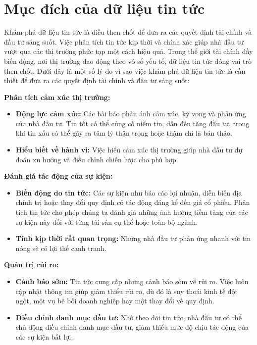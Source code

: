 \section{Mục đích của dữ liệu tin tức}

Khám phá dữ liệu tin tức là điều then chốt để đưa ra các quyết định tài chính và đầu tư sáng suốt. Việc phân tích tin tức kịp thời và chính xác giúp nhà đầu tư vượt qua các thị trường phức tạp một cách hiệu quả. Trong thế giới tài chính đầy biến động, nơi thị trường dao động theo vô số yếu tố, dữ liệu tin tức đóng vai trò then chốt. Dưới đây là một số lý do vì sao việc khám phá dữ liệu tin tức là cần thiết để đưa ra các quyết định tài chính và đầu tư sáng suốt:

\textbf{Phân tích cảm xúc thị trường:}

\begin{itemize}
\item
  \textbf{Động lực cảm xúc:} Các bài báo phản ánh cảm xúc, kỳ vọng và phản ứng của nhà đầu tư. Tin tốt có thể củng cố niềm tin, dẫn đến tăng đầu tư, trong khi tin xấu có thể gây ra tâm lý thận trọng hoặc thậm chí là bán tháo.
\item
  \textbf{Hiểu biết về hành vi:} Việc hiểu cảm xúc thị trường giúp nhà đầu tư dự đoán xu hướng và điều chỉnh chiến lược cho phù hợp.
\end{itemize}

\textbf{Đánh giá tác động của sự kiện:}

\begin{itemize}
\item
  \textbf{Biến động do tin tức:} Các sự kiện như báo cáo lợi nhuận, diễn biến địa chính trị hoặc thay đổi quy định có tác động đáng kể đến giá cổ phiếu. Phân tích tin tức cho phép chúng ta đánh giá những ảnh hưởng tiềm tàng của các sự kiện này đối với từng tài sản cụ thể hoặc toàn bộ ngành.
\item
  \textbf{Tính kịp thời rất quan trọng:} Những nhà đầu tư phản ứng nhanh với tin nóng sẽ có lợi thế cạnh tranh.
\end{itemize}

\textbf{Quản trị rủi ro:}

\begin{itemize}
\item
  \textbf{Cảnh báo sớm:} Tin tức cung cấp những cảnh báo sớm về rủi ro. Việc luôn cập nhật thông tin giúp giảm thiểu rủi ro, dù đó là suy thoái kinh tế đột ngột, một vụ bê bối doanh nghiệp hay một thay đổi về quy định.
\item
  \textbf{Điều chỉnh danh mục đầu tư:} Nhờ theo dõi tin tức, nhà đầu tư có thể chủ động điều chỉnh danh mục đầu tư, giảm thiểu mức độ chịu tác động của các sự kiện bất lợi.
\end{itemize}


